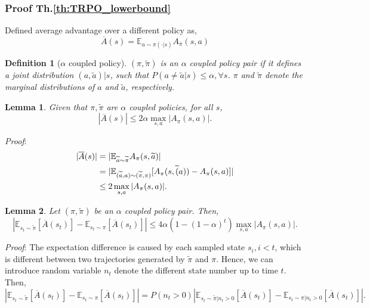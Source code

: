 \documentclass[11pt,a4paper]{article}
\def\tilde{\widetilde}
\def\tilde{\widetilde}
\def\bar{\overline}
\def\E{\mathbb{E}}
\newtheorem{lemma}{Lemma}[subsection]
\newtheorem{definition}{Definition}[subsection]
\begin{document}
\subsubsection{Proof Th.\ref{th:TRPO_lowerbound}}
Defined average advantage over a different policy as,
\begin{equation}
    \bar{A}(s) = \E_{a\sim \pi(\cdot|s)}A_{\pi}(s,a)
\end{equation}
\begin{definition}[$\alpha$ coupled policy]
$(\pi,\tilde{\pi})$ is an $\alpha$ coupled policy pair if it defines a joint distribution $(a,\tilde{a})|s$, such that $P(a\neq\tilde{a}|s) \le \alpha, \forall s$. $\pi$ and $\tilde{\pi}$ denote the marginal distributions of $a$ and $\tilde{a}$, respectively.
\end{definition}
\begin{lemma}
    \label{lem: TRPO1}
    Given that $\pi, \tilde{\pi}$ are $\alpha$ coupled policies, for all $s$, 
    \begin{equation}
        |\bar{A}(s)| \le 2\alpha \max_{s,a} |A_{\pi}(s,a)|.
    \end{equation}
\end{lemma}
\emph{Proof}:
\begin{equation}
    \aligned
    |\bar{A}(s)| & = |\E_{\tilde{a}\sim\tilde{\pi}}A_{\pi}(s,\tilde{a})| \\ 
    & = |\E_{(\tilde{a},a)\sim(\tilde{\pi},\pi)}[A_{\pi}(s,\tilde(a)) - A_{\pi}(s,a)]| \\ 
    & \le 2\max_{s,a}|A_{\pi}(s,a)|.
    \endaligned
\end{equation}
\begin{lemma}
    Let $(\pi,\tilde{\pi})$ be an $\alpha$ coupled policy pair. Then,
    \begin{equation}
        |\E_{s_t\sim\tilde{\pi}}[\bar{A}(s_t)]-\E_{s_t\sim\pi}[\bar{A}(s_t)]| \le 4\alpha(1-(1-\alpha)^t) \max_{s,a} |A_{\pi}(s,a)|.
    \end{equation}
\end{lemma}
\emph{Proof}:
The expectation difference is caused by each sampled state $s_i, i< t$, which is different between two trajectories generated by $\tilde{\pi}$ and $\pi$. Hence, we can introduce random variable $n_t$ denote the different state number up to time $t$. Then, 
\begin{equation}
    |\E_{s_t\sim\tilde{\pi}}[\bar{A}(s_t)]-\E_{s_t\sim\pi}[\bar{A}(s_t)]| = P(n_t>0)|\E_{s_t\sim\tilde{\pi}|n_t>0}[\bar{A}(s_t)]-\E_{s_t\sim\pi|n_t>0}[\bar{A}(s_t)]|.
\end{equation}
\end{document}
